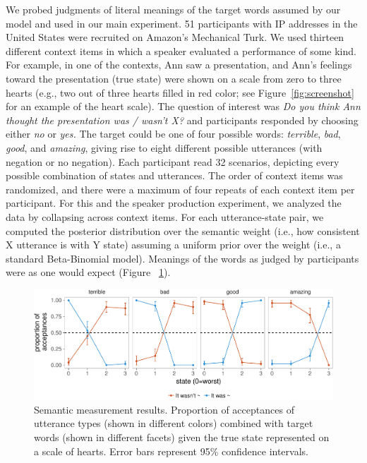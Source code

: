 \documentclass[9pt,twocolumn,twoside,lineno]{main_class_file}
\begin{document}
{We probed judgments of literal meanings of the target words assumed by
our model and used in our main experiment. 51 participants with IP
addresses in the United States were recruited on Amazon's Mechanical
Turk. We used thirteen different context items in which a speaker
evaluated a performance of some kind. For example, in one of the
contexts, Ann saw a presentation, and Ann's feelings toward the
presentation (true state) were shown on a scale from zero to three
hearts (e.g., two out of three hearts filled in red color; see
Figure~\ref{fig:screenshot} for an example of the heart scale). The
question of interest was \emph{Do you think Ann thought the
presentation was / wasn't X?} and participants responded by choosing
either \emph{no} or \emph{yes.} The target could be one of four
possible words: \emph{terrible}, \emph{bad}, \emph{good}, and
\emph{amazing}, giving rise to eight different possible utterances (with
negation or no negation). Each participant read 32 scenarios, depicting
every possible combination of states and utterances. The order of
context items was randomized, and there were a maximum of four repeats
of each context item per participant. For this and the speaker
production experiment, we analyzed the data by collapsing across context
items. For each utterance-state pair, we computed the posterior
distribution over the semantic weight (i.e., how consistent X utterance
is with Y state) assuming a uniform prior over the weight (i.e., a
standard Beta-Binomial model). Meanings of the words as judged by
participants were as one would expect (Figure ~\ref{fig:litsem}).

\begin{figure}[!h]
\includegraphics[width=\columnwidth]{fig/litsem-1}
\centering \caption{Semantic measurement results. Proportion of acceptances of utterance types (shown in different colors) combined with target words (shown in different facets) given the true state represented on a scale of hearts. Error bars represent 95\% confidence intervals.}\label{fig:litsem}
\end{figure}

}
\end{document}
